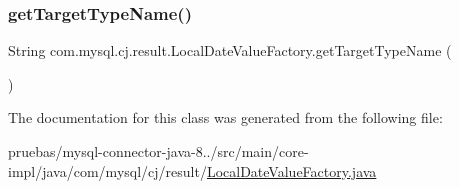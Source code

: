 \mbox{\label{classcom_1_1mysql_1_1cj_1_1result_1_1_local_date_value_factory_af5c369a382c0adc08ed7e768c5041dc5}} 
\subsubsection{\texorpdfstring{get\+Target\+Type\+Name()}{getTargetTypeName()}}
{\footnotesize\ttfamily String com.\+mysql.\+cj.\+result.\+Local\+Date\+Value\+Factory.\+get\+Target\+Type\+Name (\begin{DoxyParamCaption}{ }\end{DoxyParamCaption})}



The documentation for this class was generated from the following file\+:\begin{DoxyCompactItemize}
\item 
pruebas/mysql-\/connector-\/java-\/8../src/main/core-\/impl/java/com/mysql/cj/result/\mbox{\hyperlink{_local_date_value_factory_8java}{Local\+Date\+Value\+Factory.\+java}}\end{DoxyCompactItemize}
